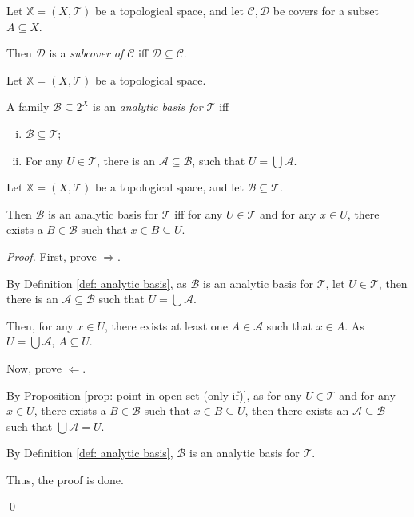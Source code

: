\begin{definition}
	\label{def: subcover}
	Let $\mathbb X = (X, \mathcal T)$ be a topological space, and let $\mathcal C, \mathcal D$ be covers for a subset $A \subseteq X$.
	
	Then $\mathcal D$ is a \textit{subcover of $\mathcal C$} iff $\mathcal D \subseteq \mathcal C$.
\end{definition}


\begin{definition}
	\label{def: analytic basis}
	Let $\mathbb X = (X, \mathcal T)$ be a topological space.
	
	A family $\mathcal B \subseteq 2^X$ is an \textit{analytic basis for $\mathcal T$} iff
	\begin{enumerate}[(i)]
		\item $\mathcal B \subseteq \mathcal T$;
		\item For any $U \in \mathcal T$, there is an $\mathcal A \subseteq \mathcal B$, such that $U = \bigcup \mathcal A$.
	\end{enumerate}
\end{definition}


\begin{proposition}
	\label{prop: alternative definition of analytic basis}
	Let $\mathbb X = (X, \mathcal T)$ be a topological space, and let $\mathcal B \subseteq \mathcal T$.
	
	Then $\mathcal B$ is an analytic basis for $\mathcal T$ iff for any $U \in \mathcal T$ and for any $x \in U$, there exists a $B \in \mathcal B$ such that $x \in B \subseteq U$.
	
	\begin{proof}
		First, prove $\Rightarrow$.
		
		By Definition \ref{def: analytic basis}, as $\mathcal B$ is an analytic basis for $\mathcal T$, let $U \in \mathcal T$, then there is an $\mathcal A \subseteq \mathcal B$ such that $U = \bigcup \mathcal A$.
		
		Then, for any $x \in U$, there exists at least one $A \in \mathcal A$ such that $x \in A$. As $U = \bigcup\mathcal A$, $A \subseteq U$.
		
		\qedlm
		
		Now, prove $\Leftarrow$.
		
		By Proposition \ref{prop: point in open set (only if)}, as for any $U \in \mathcal T$ and for any $x \in U$, there exists a $B \in \mathcal B$ such that $x \in B \subseteq U$, then there exists an $\mathcal A \subseteq \mathcal B$ such that $\bigcup \mathcal A = U$.
		
		By Definition \ref{def: analytic basis}, $\mathcal B$ is an analytic basis for $\mathcal T$.
		
		\qedlm
		
		Thus, the proof is done.
		
		\qed
	\end{proof}
\end{proposition}


